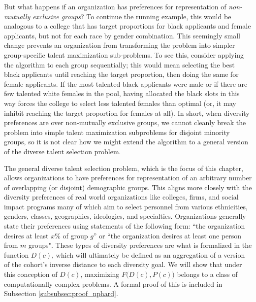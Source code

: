 But what happens if an organization has preferences for representation of \emph{non-mutually exclusive groups}? To continue the running example, this would be analogous to a college that has target proportions for black applicants and female applicants, but not for each race by gender combination. This seemingly small change prevents an organization from transforming the problem into simpler group-specific talent maximization sub-problems. To see this, consider applying the \textcite{kleinberg2018algorithmic} algorithm to each group sequentially; this would mean selecting the best black applicants until reaching the target proportion, then doing the same for female applicants. If the most talented black applicants were male or if there are few talented white females in the pool, having allocated the black slots in this way forces the college to select less talented females than optimal (or, it may inhibit reaching the target proportion for females at all). In short, when diversity preferences are over non-mutually exclusive groups, we cannot cleanly break the problem into simple talent maximization subproblems for disjoint minority groups, so it is not clear how we might extend the \textcite{kleinberg2018algorithmic} algorithm to a general version of the diverse talent selection problem. 

The general diverse talent selection problem, which is the focus of this chapter, allows organizations to have preferences for representation of an arbitrary number of overlapping (or disjoint) demographic groups. This aligns more closely with the diversity preferences of real world organizations like colleges, firms, and social impact programs many of which aim to select personnel from various ethnicities, genders, classes, geographies, ideologies, and specialties. Organizations generally state their preferences using statements of the following form: ``the organization desires at least $x\%$ of group $g$'' or ``the organization desires at least one person from $m$ groups". These types of diversity preferences are what is formalized in the function $D(c)$, which will ultimately be defined as an aggregation of a version of the cohort's inverse distance to each diversity goal. We will show that under this conception of $D(c)$, maximizing $F\Big(D(c),P(c)\Big)$ belongs to a class of computationally complex problems. A formal proof of this is included in Subsection \ref{subsubsec:proof_nphard}.

